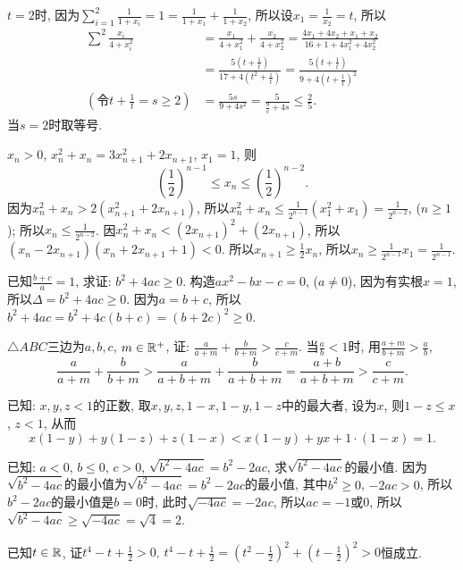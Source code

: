 $t=2$时, 因为$\sum_{i=1}^{2}\frac{1}{1+x_{i}}=1=\frac{1}{1+x_{1}}+\frac{1}{1+x_{2}}$,
所以设$x_{1}=\frac{1}{x_{2}}=t$, 所以
\[
\begin{aligned}\sum^{2}\frac{x_{i}}{4+x_{i}^{2}} & =\frac{x_{1}}{4+x_{1}^{2}}+\frac{x_{2}}{4+x_{2}^{2}}=\frac{4x_{1}+4x_{2}+x_{1}+x_{2}}{16+1+4x_{1}^{2}+4x_{2}^{2}}\\
 & =\frac{5\left(t+\frac{1}{t}\right)}{17+4\left(t^{2}+\frac{1}{t}\right)}=\frac{5\left(t+\frac{1}{t}\right)}{9+4\left(t+\frac{1}{t}\right)^{2}}\\
\left(\text{令}t+\frac{1}{t}=s\ge2\right) & =\frac{5s}{9+4s^{2}}=\frac{5}{\frac{9}{s}+4s}\le\frac{2}{5}.
\end{aligned}
\]
当$s=2$时取等号.

$x_{n}>0$, $x_{n}^{2}+x_{n}=3x_{n+1}^{2}+2x_{n+1}$, $x_{1}=1$,
则
\[
\left(\frac{1}{2}\right)^{n-1}\le x_{n}\le\left(\frac{1}{2}\right)^{n-2}.
\]
\eq
\ba
因为$x_{n}^{2}+x_{n}>2\left(x_{n+1}^{2}+2x_{n+1}\right)$, 所以$x_{n}^{2}+x_{n}\le\frac{1}{2^{n-1}}\left(x_{1}^{2}+x_{1}\right)=\frac{1}{2^{n-2}}$,
($n\ge1$); 所以$x_{n}\le\frac{1}{2^{n-2}}$. 因$x_{n}^{2}+x_{n}<\left(2x_{n+1}\right)^{2}+\left(2x_{n+1}\right)$,
所以$\left(x_{n}-2x_{n+1}\right)\left(x_{n}+2x_{n+1}+1\right)<0$. 所以$x_{n+1}\ge\frac{1}{2}x_{n}$,
所以$x_{n}\ge\frac{1}{2^{n-1}}x_{1}=\frac{1}{2^{n-1}}$.
\ea

\bq{}{}
已知$\frac{b+c}{a}=1$, 求证: $b^{2}+4ac\ge0$.
\eq
\ba
构造$ax^{2}-bx-c=0$, ($a\ne0$), 因为有实根$x=1$, 所以$\Delta=b^{2}+4ac\ge0$.
\ea
\ba
因为$a=b+c$, 所以$b^{2}+4ac=b^{2}+4c\left(b+c\right)=\left(b+2c\right)^{2}\ge0$. 
\ea

\bq{}{}
$\triangle ABC$三边为$a,b,c$, $m\in\mathbb{R}^{+}$, 证: $\frac{a}{a+m}+\frac{b}{b+m}>\frac{c}{c+m}$.
\eq
\ba
当$\frac{a}{b}<1$时, 用$\frac{a+m}{b+m}>\frac{a}{b}$, 
\[
\frac{a}{a+m}+\frac{b}{b+m}>\frac{a}{a+b+m}+\frac{b}{a+b+m}=\frac{a+b}{a+b+m}>\frac{c}{c+m}.
\]
\ea

\bq{}{}
已知: $x,y,z<1$的正数, 取$x,y,z,1-x,1-y,1-z$中的最大者, 设为$x$, 则$1-z\le x$,
$z<1$, 从而
\[
x\left(1-y\right)+y\left(1-z\right)+z\left(1-x\right)<x\left(1-y\right)+yx+1\cdot\left(1-x\right)=1.
\]
\eq

\bq{}{}
已知: $a<0$, $b\le0$, $c>0$, $\sqrt{b^{2}-4ac}=b^{2}-2ac$, 求$\sqrt{b^{2}-4ac}$的最小值.
\eq
\ba
因为$\sqrt{b^{2}-4ac}$的最小值为$\sqrt{b^{2}-4ac}=b^{2}-2ac$的最小值, 其中$b^{2}\ge0$,
$-2ac>0$, 所以$b^{2}-2ac$的最小值是$b=0$时, 此时$\sqrt{-4ac}=-2ac$, 所以$ac=-1$或$0$,
所以$\sqrt{b^{2}-4ac}\ge\sqrt{-4ac}=\sqrt{4}=2$.
\ea

\bq{}{}
已知$t\in\mathbb{R}$, 证$t^{4}-t+\frac{1}{2}>0$. 
\eq
\ba
$t^{4}-t+\frac{1}{2}=\left(t^{2}-\frac{1}{2}\right)^{2}+\left(t-\frac{1}{2}\right)^{2}>0$恒成立.
\ea
\newpage